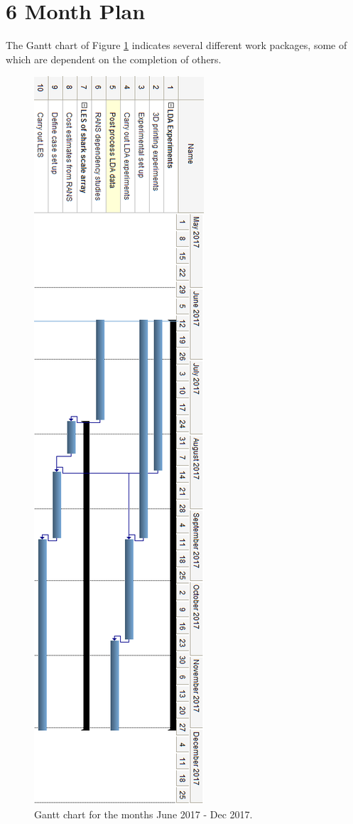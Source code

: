 \documentclass[12pt,oneside,a4paper]{article}
\begin{document}
\section{6 Month Plan}
The Gantt chart of Figure \ref{figure:ganttChart2} indicates several different work packages, some of which are dependent on the completion of others.
%
\begin{figure}
\centering
\includegraphics[height=0.97\textheight]{images/170614_6MonthPlan.png}
\caption{Gantt chart for the months June 2017 - Dec 2017.}
\label{figure:ganttChart2}
\end{figure}
\end{document}
